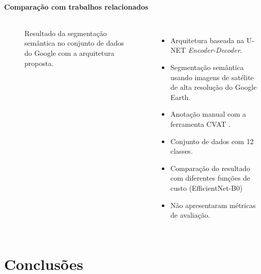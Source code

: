 \documentclass[%
  10pt,%
  aspectratio = 169,%
  compress,%
  t,%
  english,%
  brazilian,%
  tikz,
]{beamer}
\begin{document}
\begin{frame}
\framesubtitle{Comparação com trabalhos relacionados}
\begin{columns}[T]

    \begin{figure}[!htb]
        \centering%
        \caption{Resultado da segmentação semântica no conjunto de dados do Google com a arquitetura proposta.}%
    \end{figure}


    \begin{itemize}
        \item Arquitetura baseada na U-NET \textit{Encoder-Decoder}.
        \item Segmentação semântica usando imagens de satélite de alta resolução do Google Earth.
        \item Anotação manual com a ferramenta CVAT \cite{cvat}.
        \item Conjunto de dados com 12 classes.
        \item Comparação do resultado com diferentes funções de custo (EfficientNet-B0)
        \item Não apresentaram métricas de avaliação.
    \end{itemize}

\end{columns}
\end{frame}

\section{Conclusões}\label{sec:concl}
\end{document}
